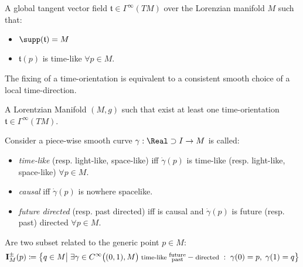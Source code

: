 \documentclass[a4paper,12pt]{scrartcl}    %
\begin{document}
	\begin{definition}
		A global tangent vector field  $\mathfrak{t}\in \Gamma^\infty(TM)$ over the Lorenzian manifold $M$ such that:
		\begin{itemize}
			\item $\supp(\mathfrak{t}) = M$
			\item $\mathfrak{t}(p)$ is time-like $\forall p \in M$.
		\end{itemize}
	\end{definition}
	\begin{observation}
		The fixing of a time-orientation is equivalent to a consistent smooth choice of a local time-direction.
	\end{observation}	
	
	\begin{definition}
		A Lorentzian Manifold $(M,g)$ such that exist at least one time-orientation $\mathfrak{t}\in \Gamma^\infty(TM)$.
	\end{definition}

	\begin{notationfix}
		Consider a piece-wise smooth curve $\gamma: \Real\supset I \rightarrow M$ is called:
		\begin{itemize}
			\item \emph{time-like} (resp. light-like, space-like) iff $\dot{\gamma}(p)$ is time-like (resp. light-like, space-like) $\forall p \in M$.
			\item \emph{causal} iff $\dot{\gamma}(p)$ is nowhere spacelike.
			\item \emph{future directed} (resp. past directed) iff is causal and  $\dot{\gamma}(p)$ is future (resp. past) directed $\forall p \in M$.
		\end{itemize}
	\end{notationfix}

	\begin{definition}
		Are two subset related to the generic point $p	\in M$:
		\begin{displaymath}
			\mathbf{I}_M^\pm(p) \coloneqq \big\{ q \in M \big\vert \; \exists \gamma \in C^\infty\big((0,1), M\big)\;  \textrm{\footnotesize time-like } \substack{\textrm{future}\\ \textrm{past} } -\textrm{\footnotesize directed }:\; \gamma(0)=p,\; \gamma(1)=q  \big\}
		\end{displaymath}
	\end{definition}
	
\end{document}
